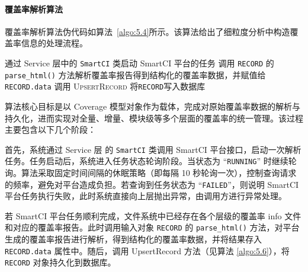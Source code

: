 \paragraph{\textbf{覆盖率解析算法}}
覆盖率解析算法伪代码如算法~\ref{algo:5.4}所示。该算法给出了细粒度分析中构造覆盖率信息的处理流程。

\begin{algorithm}[ht]
\caption{细粒度分析-接口适配层-覆盖率解析算法}
\label{algo:5.4}

通过 Service 层中的 \texttt{SmartCI} 类启动 SmartCI 平台的任务\;
调用 \texttt{RECORD} 的 \texttt{parse\_html()} 方法解析覆盖率报告得到结构化的覆盖率数据，并赋值给 \texttt{RECORD.data} \;
调用 \textsc{UpsertRecord} 将\texttt{RECORD}写入数据库 
\end{algorithm}

算法核心目标是以 Coverage 模型对象作为载体，完成对原始覆盖率数据的解析与持久化，进而实现对全量、增量、模块级等多个层面的覆盖率的统一管理。该过程主要包含以下几个阶段：

首先，系统通过 Service 层 的 \verb|SmartCI| 类调用 SmartCI 平台接口，启动一次解析任务。任务启动后，系统进入任务状态轮询阶段。当状态为 “\verb|RUNNING|” 时继续轮询。算法采取固定时间间隔的休眠策略（即每隔 10 秒轮询一次），控制查询请求的频率，避免对平台造成负担。若查询到任务状态为 “\verb|FAILED|”，则说明 SmartCI 平台任务执行失败，此时系统直接向上层抛出异常，由调用方进行异常处理。

若 SmartCI 平台任务顺利完成，文件系统中已经存在各个层级的覆盖率 info 文件和对应的覆盖率报告。此时调用输入对象 \verb|RECORD| 的 \verb|parse_html()| 方法，对平台生成的覆盖率报告进行解析，得到结构化的覆盖率数据，并将结果存入 \verb|RECORD.data| 属性中。随后，调用 UpsertRecord 方法（见算法 \ref{algo:5.6}），将 \verb|RECORD| 对象持久化到数据库。

